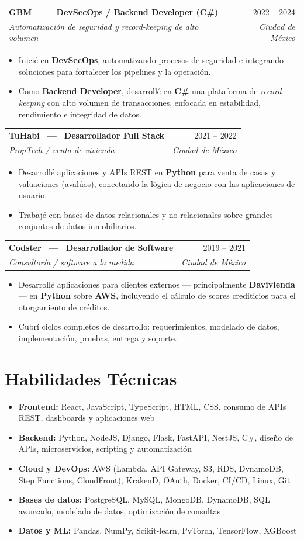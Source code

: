 \documentclass[11pt,a4paper]{article}
\makeatletter
\newcommand{\cventry}[4]{%
  \begin{tabularx}{\linewidth}{@{}X r@{}}
    \textbf{#1} & {\color{muted}#2}\\[2pt]
    {\color{muted}\itshape #3} & {\color{muted}\itshape #4}\\
  \end{tabularx}%
  \vspace{-0.05em}%
}
\makeatother
\begin{document}
\cventry{GBM \, — \, DevSecOps / Backend Developer (C\#)}{2022 -- 2024}{Automatización de seguridad y record-keeping de alto volumen}{Ciudad de México}
\begin{itemize}
  \item Inicié en \textbf{DevSecOps}, automatizando procesos de seguridad e integrando soluciones para fortalecer los pipelines y la operación.
  \item Como \textbf{Backend Developer}, desarrollé en \textbf{C\#} una plataforma de \emph{record-keeping} con alto volumen de transacciones, enfocada en estabilidad, rendimiento e integridad de datos.
\end{itemize}

\cventry{TuHabi \, — \, Desarrollador Full Stack}{2021 -- 2022}{PropTech / venta de vivienda}{Ciudad de México}
\begin{itemize}
  \item Desarrollé aplicaciones y APIs REST en \textbf{Python} para venta de casas y valuaciones (avalúos), conectando la lógica de negocio con las aplicaciones de usuario.
  \item Trabajé con bases de datos relacionales y no relacionales sobre grandes conjuntos de datos inmobiliarios.
\end{itemize}

\cventry{Codster \, — \, Desarrollador de Software}{2019 -- 2021}{Consultoría / software a la medida}{Ciudad de México}
\begin{itemize}
  \item Desarrollé aplicaciones para clientes externos — principalmente \textbf{Davivienda} — en \textbf{Python} sobre \textbf{AWS}, incluyendo el cálculo de scores crediticios para el otorgamiento de créditos.
  \item Cubrí ciclos completos de desarrollo: requerimientos, modelado de datos, implementación, pruebas, entrega y soporte.
\end{itemize}

\section{Habilidades Técnicas}
\begin{itemize}[label={}, leftmargin=0em, itemsep=3pt]
  \item \textbf{Frontend:} React, JavaScript, TypeScript, HTML, CSS, consumo de APIs REST, dashboards y aplicaciones web
  \item \textbf{Backend:} Python, NodeJS, Django, Flask, FastAPI, NestJS, C\#, diseño de APIs, microservicios, scripting y automatización
  \item \textbf{Cloud y DevOps:} AWS (Lambda, API Gateway, S3, RDS, DynamoDB, Step Functions, CloudFront), KrakenD, OAuth, Docker, CI/CD, Linux, Git
  \item \textbf{Bases de datos:} PostgreSQL, MySQL, MongoDB, DynamoDB, SQL avanzado, modelado de datos, optimización de consultas
  \item \textbf{Datos y ML:} Pandas, NumPy, Scikit-learn, PyTorch, TensorFlow, XGBoost
\end{itemize}
\end{document}
